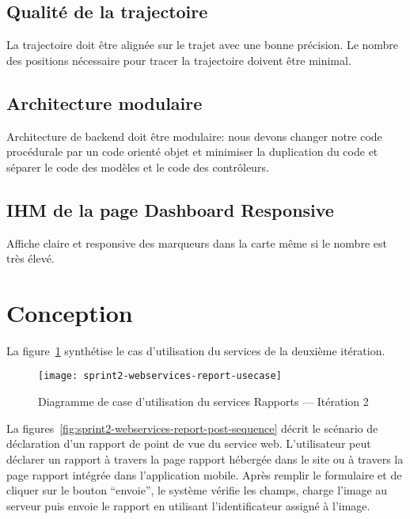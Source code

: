 \subsection{Qualité de la trajectoire}

La trajectoire doit être alignée sur le trajet avec une bonne précision. Le
nombre des positions nécessaire pour tracer la trajectoire doivent être minimal.

\subsection{Architecture modulaire}

Architecture de backend doit être modulaire: nous devons changer notre code
procédurale par un code orienté objet et minimiser la duplication du code et
séparer le code des modèles et le code des contrôleurs.

\subsection{IHM de la page Dashboard Responsive}

Affiche claire et responsive des marqueurs dans la carte même si le nombre est
très élevé.

\section{Conception}

La figure~\ref{fig:sprint2-webservices-report-usecase} synthétise le cas
d'utilisation du services  de la deuxième itération.

\begin{figure}[H]
    \centering
    \texttt{[image: sprint2-webservices-report-usecase]}
    \caption{Diagramme de case d'utilisation du services Rapports --- Itération 2}
\label{fig:sprint2-webservices-report-usecase}
\end{figure}

La figures~\ref{fig:sprint2-webservices-report-post-sequence} décrit le
scénario de déclaration d'un rapport de point de vue du service web.
L'utilisateur peut déclarer un rapport à travers la page rapport hébergée dans
le site ou à travers la page rapport intégrée dans l'application mobile. Après remplir le formulaire et de cliquer sur le bouton ``envoie'', le système
vérifie les champs, charge l'image au serveur puis envoie le rapport en
utilisant l'identificateur assigné à l'image.


